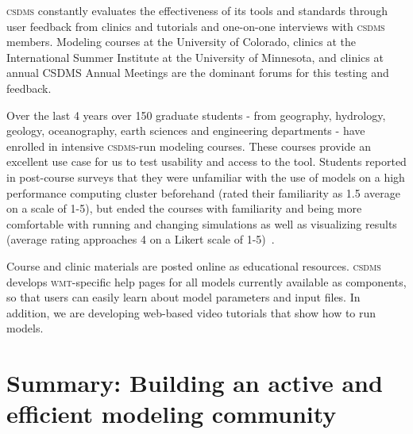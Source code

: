 \documentclass[11pt, oneside]{amsart}
\DeclareRobustCommand{\csdms}{\textsc{csdms}}
\DeclareRobustCommand{\wmt}{\textsc{wmt}}
\begin{document}

\csdms{} constantly evaluates the effectiveness of its tools and standards
through user feedback from clinics and tutorials and one-on-one interviews
with \csdms{} members.  Modeling courses at the University of Colorado,
clinics at the International Summer Institute at the University of Minnesota,
and clinics at annual CSDMS Annual Meetings are the dominant forums for
this testing and feedback. 


Over the last 4 years over 150 graduate students - from geography, hydrology,
geology, oceanography, earth sciences and engineering departments - have
enrolled in intensive \csdms{}-run modeling courses. These courses
provide an excellent use case for us to test usability and access to the
tool. Students reported in post-course surveys that they were unfamiliar with
the use of models on a high performance computing cluster beforehand (rated
their familiarity as 1.5 average on a scale of 1-5), but ended the courses
with familiarity and being more comfortable with running and changing
simulations as well as visualizing results (average rating approaches 4 on
a Likert scale of 1-5)~\cite{overeem2013strategies}. 


Course and clinic materials are posted online as educational resources.
\csdms{} develops \wmt{}-specific help pages for all models currently
available as components, so that users can easily learn about model
parameters and input files. In addition, we are developing web-based video
tutorials that show how to run models.

\section{Summary: Building an active and efficient modeling community}
\end{document}
